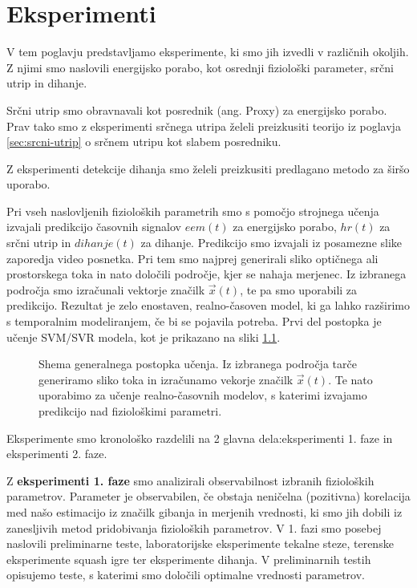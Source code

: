 \chapter{Eksperimenti}\label{sec:eksperimenti}
V tem poglavju predstavljamo eksperimente, ki smo jih izvedli v različnih okoljih. Z njimi smo naslovili energijsko porabo, kot osrednji fiziološki parameter, srčni utrip in dihanje. 

Srčni utrip smo obravnavali kot posrednik (ang. Proxy) za energijsko porabo. Prav tako smo z eksperimenti srčnega utripa želeli preizkusiti teorijo iz poglavja \ref{sec:srcni-utrip} o srčnem utripu kot slabem posredniku.

Z eksperimenti detekcije dihanja smo želeli preizkusiti predlagano metodo za širšo uporabo.

Pri vseh naslovljenih fizioloških parametrih smo s pomočjo strojnega učenja izvajali predikcijo časovnih signalov $eem(t)$ za energijsko porabo, $hr(t)$ za srčni utrip in $dihanje(t)$ za dihanje. Predikcijo smo izvajali iz posamezne slike zaporedja video posnetka. Pri tem smo najprej generirali sliko optičnega ali prostorskega toka in nato določili področje, kjer se nahaja merjenec. Iz izbranega področja smo izračunali vektorje značilk $\vec{x}(t)$, te pa smo uporabili za predikcijo. Rezultat je zelo enostaven, realno-časoven model, ki ga lahko razširimo s temporalnim modeliranjem, če bi se pojavila potreba. Prvi del postopka je učenje SVM/SVR modela, kot je prikazano na sliki \ref{fig:shema-generalnega-postopka}.

\begin{figure}[!htb]
	\centering
	\resizebox{\columnwidth}{!}{}
	\caption[Shema generalnega postopka procesiranja]{Shema generalnega postopka učenja. Iz izbranega področja tarče generiramo sliko toka in izračunamo vekorje značilk $\vec{x}(t)$. Te nato uporabimo za učenje realno-časovnih modelov, s katerimi izvajamo predikcijo nad fiziološkimi parametri.}
	\label{fig:shema-generalnega-postopka}
\end{figure}

Eksperimente smo kronološko razdelili na 2 glavna dela:eksperimenti 1. faze in eksperimenti 2. faze.

Z \textbf{eksperimenti 1. faze} smo analizirali observabilnost izbranih fizioloških parametrov. Parameter je observabilen, če obstaja neničelna (pozitivna) korelacija med našo estimacijo iz značilk gibanja in merjenih vrednosti, ki smo jih dobili iz zanesljivih metod pridobivanja fizioloških parametrov. V 1. fazi smo posebej naslovili preliminarne teste, laboratorijske eksperimente tekalne steze, terenske eksperimente squash igre ter eksperimente dihanja. V {preliminarnih testih} opisujemo teste, s katerimi smo določili optimalne vrednosti parametrov. 


